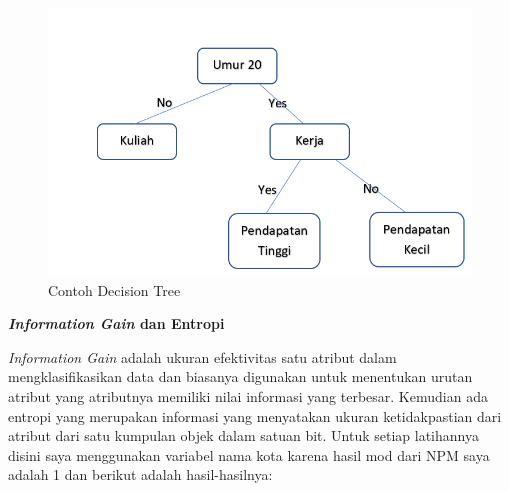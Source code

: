 \documentclass{report}
\begin{document}
\begin{figure}[hbtp]
\caption{Contoh Decision Tree}
\centering
\includegraphics[scale=0.6]{../figures/Decision Tree.png}
\end{figure}

\vspace{0.5cm}

{\bf \emph{Information Gain} dan Entropi}
\vspace{0.1cm}

\hangindent=0.5cm \emph{Information Gain} adalah ukuran efektivitas satu atribut dalam mengklasifikasikan data dan biasanya digunakan untuk menentukan urutan atribut yang atributnya memiliki nilai informasi yang terbesar. Kemudian ada entropi yang merupakan informasi yang menyatakan ukuran ketidakpastian dari atribut dari satu kumpulan objek dalam satuan bit. Untuk setiap latihannya disini saya menggunakan variabel nama kota karena hasil mod dari NPM saya adalah 1 dan berikut adalah hasil-hasilnya:
\end{document}
